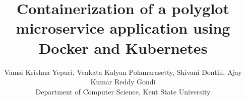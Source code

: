 \usepackage{filecontents}
\usepackage{cite}
\usepackage{amsmath,amssymb,amsfonts}
\usepackage{graphicx}
\usepackage{textcomp}
\usepackage{tabularx}
\usepackage{subcaption}
\usepackage{makecell}
\usepackage{url}
\usepackage[switch]{lineno}
\usepackage{listings}
\usepackage{multirow}
\usepackage{graphicx}
\usepackage{adjustbox}

\captionsetup{compatibility=false}
\usepackage[margin=0.5in]{geometry}
\usepackage{textcomp}

\usepackage{listings}
\usepackage{tikz}
\def\checkmark{\tikz\fill[scale=0.4](0,.35) -- (.25,0) -- (1,.7) -- (.25,.15) -- cycle;} 
\graphicspath{ {./images/} }




\title{ Containerization of a polyglot microservice application using
Docker and Kubernetes 
}

\author{Vamsi Krishna Yepuri,  Venkata Kalyan Polamarasetty, Shivani Donthi, Ajay Kumar Reddy Gondi \\
Department of Computer Science, Kent State University}

